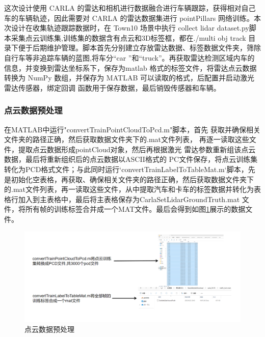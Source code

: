 这次设计使用 CARLA 的雷达和相机进行数据融合进行车辆跟踪，获得相对自己车的车辆轨迹，因此需要对 CARLA 的雷达数据集进行 pointPillars 网络训练。本次设计在收集轨迹跟踪数据时，在 Town10 场景中执行 collect lidar dataset.py脚本采集点云训练集,训练集的数据含有点云和3D标签框，都在./multi obj track 目录下便于后期维护管理。脚本首先分别建立存放雷达数据、标签数据文件夹，筛除自行车等非追踪车辆的蓝图,将车分“car ”和“truck”。再获取雷达检测区域内车的信息，并变换到雷达坐标系下，保存为matlab 格式的标签文件，将雷达点云数据转换为 NumPy 数组，并保存为 MATLAB 可以读取的格式，后配置并启动激光雷达传感器，绑定回调 函数用于保存数据，最后销毁传感器和车辆。

\subsubsection{点云数据预处理}
在MATLAB中运行"convertTrainPointCloudToPcd.m"脚本，首先 获取并确保相关文件夹的路径正确，然后获取数据文件夹下的.mat文件列表， 再逐一读取这些文件，提取点云数据形成pointCloud对象，然后再根据激光 雷达参数重新组该点云数据，最后将重新组织后的点云数据以ASCII格式的 PC文件保存，将点云训练集转化为PCD格式文件；与此同时运行‘convertTrainLabelToTableMat.m‘脚本，先是初始化空表格，再获取、确保相关文件夹的路径正确，然后获取数据文件夹下的.mat文件列表，再一读取这些文件，从中提取汽车和卡车的标签数据并转化为表格行加入到主表格中，最后将主表格保存为CarlaSetLidarGroundTruth.mat 文件，将所有帧的训练标签合并成一个MAT文件。最后会得到如图\ref{fig:p10}展示的数据文件。




\begin{figure}[htbp] %
	\centering
	\includegraphics[width=1\textwidth]{p10} %
	\caption{点云数据预处理} %
	\label{fig:p10} %
\end{figure}




